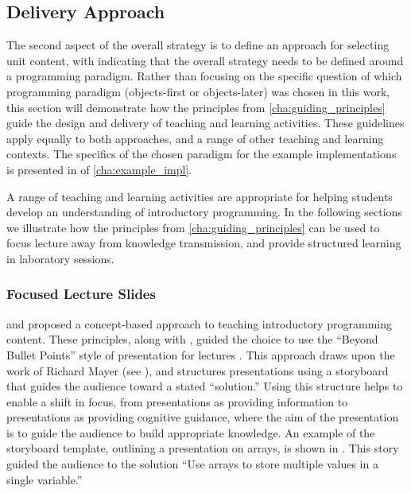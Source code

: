 %
%
% 


\subsection{Delivery Approach} %
\label{sub:delivery_approach}

The second aspect of the overall strategy is to define an approach for selecting unit content, with  indicating that the overall strategy needs to be defined around a programming paradigm. Rather than focusing on the specific question of which programming paradigm (objects-first or objects-later) was chosen in this work, this section will demonstrate how the principles from \cref{cha:guiding_principles} guide the design and delivery of teaching and learning activities. These guidelines apply equally to both approaches, and a range of other teaching and learning contexts. The specifics of the chosen paradigm for the example implementations is presented in  of \cref{cha:example_impl}.

A range of teaching and learning activities are appropriate for helping students develop an understanding of introductory programming. In the following sections we illustrate how the principles from \cref{cha:guiding_principles} can be used to focus lecture away from knowledge transmission, and provide structured learning in laboratory sessions.

\subsubsection{Focused Lecture Slides} %
\label{ssub:lecture_slides}

 and  proposed a concept-based approach to teaching introductory programming content. These principles, along with , guided the choice to use the ``Beyond Bullet Points'' style of presentation for lectures \cite{Atkinson:2007}. This approach draws upon the work of Richard Mayer (see \citet{Mayer:2005}), and structures presentations using a storyboard that guides the audience toward a stated ``solution.'' Using this structure helps to enable a shift in focus, from presentations as providing information to presentations as providing cognitive guidance, where the aim of the presentation is to guide the audience to build appropriate knowledge. An example of the storyboard template, outlining a presentation on arrays, is shown in . This story guided the audience to the solution ``Use arrays to store multiple values in a single variable.''

